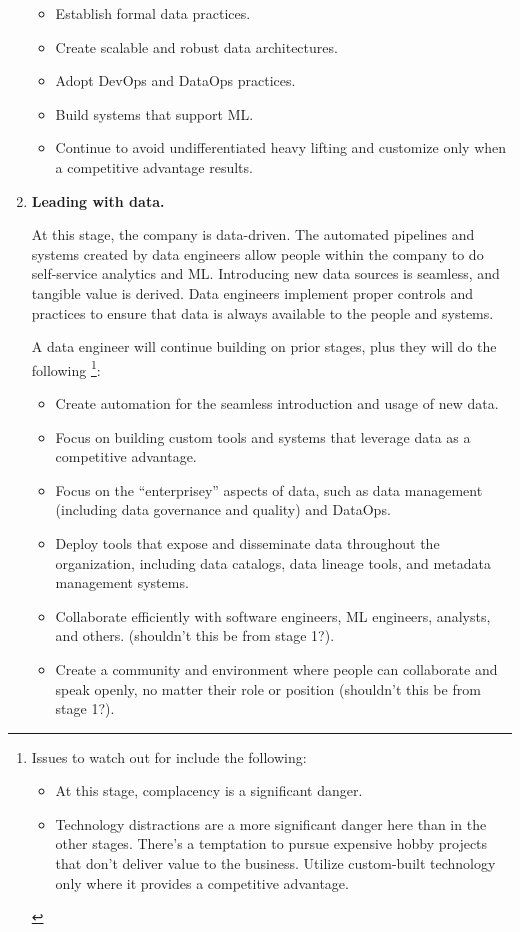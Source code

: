 \begin{enumerate}
    \begin{itemize}
        \item Establish formal data practices.
        \item Create scalable and robust data architectures.
        \item Adopt DevOps and DataOps practices.
        \item Build systems that support ML.
        \item Continue to avoid undifferentiated heavy lifting and
        customize only when a competitive advantage results.
    \end{itemize}


    \item \textbf{Leading with data.}
    
    \noindent
    At this stage, the company is data-driven. The automated pipelines
    and systems created  by data engineers allow people within the
    company to do self-service analytics and ML. Introducing new data
    sources is seamless, and tangible value is derived. Data engineers
    implement proper controls and practices to ensure that data is
    always available to the people and systems.

    A data engineer will continue building on prior stages, plus they
    will do the following
    \footnote{
        Issues to watch out for include the following:
        \begin{itemize}
            \item At this stage, complacency is a significant danger.
            \item Technology distractions are a more significant danger
            here than in the other stages. There's a temptation to
            pursue expensive hobby projects that don't deliver value
            to the business. Utilize custom-built technology only where
            it provides a competitive advantage.
        \end{itemize}
    }:
    \begin{itemize}
        \item Create automation for the seamless introduction and usage
        of new data.
        \item Focus on building custom tools and systems that leverage
        data as a competitive advantage.
        \item Focus on the “enterprisey” aspects of data, such as data
        management (including data governance and quality) and DataOps.
        \item Deploy tools that expose and disseminate data throughout
        the organization, including data catalogs, data lineage tools,
        and metadata management systems.
        \item Collaborate efficiently with software engineers,
        ML engineers, analysts, and others.
        (shouldn't this be from stage 1?).
        \item Create a community and environment where people can
        collaborate and speak openly, no matter their role or position
        (shouldn't this be from stage 1?).
    \end{itemize}
\end{enumerate}

